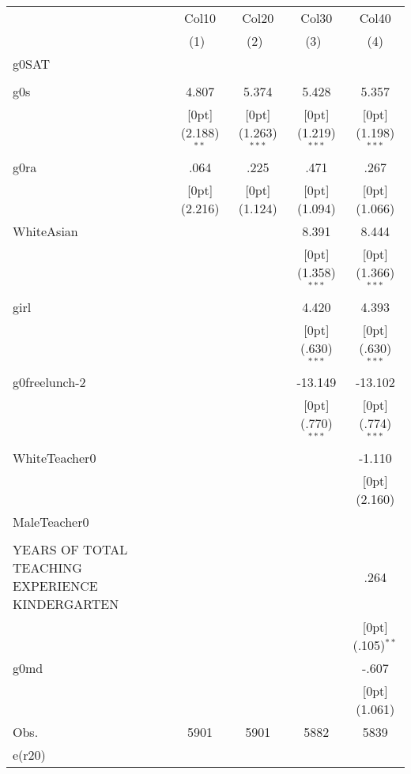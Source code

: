 \begin{tabular*}{\textwidth}{@{\extracolsep{\fill}}lcccc}				
	& \multicolumn{1}{c}{Col10} &	\multicolumn{1}{c}{Col20} &	\multicolumn{1}{c}{Col30} &	\multicolumn{1}{c}{Col40} \\
\cline{2-5}				
	& \multicolumn{1}{c}{(1)\mbox{\ }} &	\multicolumn{1}{c}{(2)\mbox{\ }} &	\multicolumn{1}{c}{(3)\mbox{\ }} &	\multicolumn{1}{c}{(4)} \\
\hline				
g0SAT &	&	&	&	\\
&	&	&	&	\\
g0s &	4.807 &	5.374 &	5.428 &	5.357 \\
&	\raisebox{.7ex}[0pt]{\scriptsize (2.188)$^{**}$} &	\raisebox{.7ex}[0pt]{\scriptsize (1.263)$^{***}$} &	\raisebox{.7ex}[0pt]{\scriptsize (1.219)$^{***}$} &	\raisebox{.7ex}[0pt]{\scriptsize (1.198)$^{***}$} \\
g0ra &	.064 &	.225 &	.471 &	.267 \\
&	\raisebox{.7ex}[0pt]{\scriptsize (2.216)} &	\raisebox{.7ex}[0pt]{\scriptsize (1.124)} &	\raisebox{.7ex}[0pt]{\scriptsize (1.094)} &	\raisebox{.7ex}[0pt]{\scriptsize (1.066)} \\
WhiteAsian &	&	&	8.391 &	8.444 \\
&	&	&	\raisebox{.7ex}[0pt]{\scriptsize (1.358)$^{***}$} &	\raisebox{.7ex}[0pt]{\scriptsize (1.366)$^{***}$} \\
girl &	&	&	4.420 &	4.393 \\
&	&	&	\raisebox{.7ex}[0pt]{\scriptsize (.630)$^{***}$} &	\raisebox{.7ex}[0pt]{\scriptsize (.630)$^{***}$} \\
g0freelunch-2 &	&	&	-13.149 &	-13.102 \\
&	&	&	\raisebox{.7ex}[0pt]{\scriptsize (.770)$^{***}$} &	\raisebox{.7ex}[0pt]{\scriptsize (.774)$^{***}$} \\
WhiteTeacher0 &	&	&	&	-1.110 \\
&	&	&	&	\raisebox{.7ex}[0pt]{\scriptsize (2.160)} \\
MaleTeacher0 &	&	&	&	\\
&	&	&	&	\\
YEARS OF TOTAL TEACHING EXPERIENCE KINDERGARTEN &	&	&	&	.264 \\
&	&	&	&	\raisebox{.7ex}[0pt]{\scriptsize (.105)$^{**}$} \\
g0md &	&	&	&	-.607 \\
&	&	&	&	\raisebox{.7ex}[0pt]{\scriptsize (1.061)} \\
Obs. &	5901 &	5901 &	5882 &	5839 \\
e(r20) &	&	&	&	\\
\hline\hline				
\end{tabular*}%
